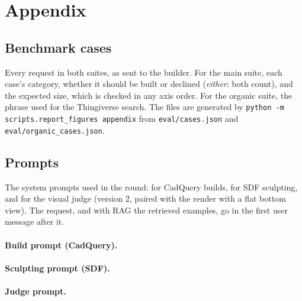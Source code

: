 \section{Appendix}
\label{sec:appendix}


\subsection{Benchmark cases}
Every request in both suites, as sent to the builder.
For the main suite, each case's category, whether it should be built or declined (\emph{either}: both count), and the expected size, which is checked in any axis order.
For the organic suite, the phrase used for the Thingiverse search.
The files are generated by \texttt{python -m scripts.report\_figures appendix} from \texttt{eval/cases.json} and \texttt{eval/organic\_cases.json}.



\subsection{Prompts}
The system prompts used in the round: for CadQuery builds, for SDF sculpting, and for the visual judge (version 2, paired with the render with a flat bottom view).
The request, and with RAG the retrieved examples, go in the first user message after it.

\paragraph{Build prompt (CadQuery).}


\paragraph{Sculpting prompt (SDF).}


\paragraph{Judge prompt.}


